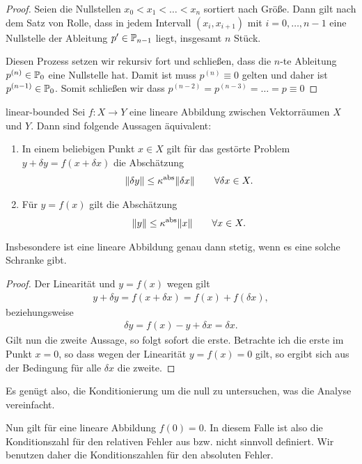 \begin{proof}
  Seien die Nullstellen $x_0 < x_1 < \dots < x_n$ sortiert nach
  Größe. Dann gilt nach dem Satz von Rolle, dass in jedem Intervall
  $(x_i, x_{i+1})$ mit $i=0,\dots, n-1$ eine Nullstelle der Ableitung
  $p'\in \P_{n-1}$ liegt, insgesamt $n$ Stück.

  Diesen Prozess setzen wir rekursiv fort und schließen, dass die $n$-te
  Ableitung $p^{(n)} \in \P_0$ eine Nullstelle hat. Damit ist muss
  $p^{(n)}\equiv 0$ gelten und daher ist $p^{(n-1)} \in \P_0$. Somit
  schließen wir dass $p^{(n-2)} = p^{(n-3)} = \dots = p \equiv 0$
\end{proof}


\begin{Lemma}{linear-bounded}
  Sei $f\colon X \to Y$ eine lineare Abbildung zwischen Vektorräumen
  $X$ und $Y$. Dann sind folgende Aussagen äquivalent:
  \begin{enumerate}
  \item In einem beliebigen Punkt $x\in X$ gilt für das gestörte Problem
    $y+\delta y = f(x+\delta x)$ die Abschätzung
    \begin{gather}
      \norm{\delta y} \le \kappa^{\text{abs}} \norm{\delta x}
      \qquad\forall \delta x \in X.
    \end{gather}
  \item Für $y = f(x)$ gilt die Abschätzung
    \begin{gather}
      \norm{y} \le \kappa^{\text{abs}} \norm{x}
      \qquad\forall x \in X.
    \end{gather}
  \end{enumerate}
  Insbesondere ist eine lineare Abbildung genau dann stetig, wenn es
  eine solche Schranke gibt.
\end{Lemma}
\begin{proof}
  Der Linearität und $y=f(x)$ wegen gilt
  \begin{gather}
    y + \delta y = f(x+\delta x) = f(x) + f(\delta x),
  \end{gather}
  beziehungsweise
  \begin{gather}
    \delta y = f(x) - y + \delta x = \delta x.
  \end{gather}
  Gilt nun die zweite Aussage, so folgt sofort die erste. Betrachte
  ich die erste im Punkt $x=0$, so dass wegen der Linearität
  $y=f(x) = 0$ gilt, so ergibt sich aus der Bedingung \glqq für alle
  $\delta x$\grqq{} die zweite.
\end{proof}

\begin{remark}
  Es genügt also, die Konditionierung um die null zu untersuchen, was
  die Analyse vereinfacht.

  Nun gilt für eine lineare Abbildung $f(0) = 0$. In diesem Falle ist
  also die Konditionszahl für den relativen Fehler aus
  bzw.  nicht sinnvoll definiert. Wir
  benutzen daher die Konditionszahlen für den absoluten Fehler. 
\end{remark}

